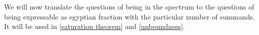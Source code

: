 We will now translate the questions of being in the spectrum 
to the questions of being expressable as egyptian fraction with the particular number 
of summands. It will be used in \ref{saturation theorem} and \ref{unboundness}.

%

